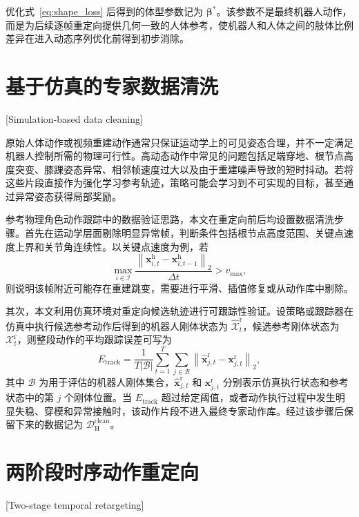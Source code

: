 优化式~\eqref{eq:shape_loss} 后得到的体型参数记为 $\boldsymbol{\beta}^{\ast}$。该参数不是最终机器人动作，而是为后续逐帧重定向提供几何一致的人体参考，使机器人和人体之间的肢体比例差异在进入动态序列优化前得到初步消除。

\section{基于仿真的专家数据清洗}[Simulation-based data cleaning]

原始人体动作或视频重建动作通常只保证运动学上的可见姿态合理，并不一定满足机器人控制所需的物理可行性。高动态动作中常见的问题包括足端穿地、根节点高度突变、膝踝姿态异常、相邻帧速度过大以及由于重建噪声导致的短时抖动。若将这些片段直接作为强化学习参考轨迹，策略可能会学习到不可实现的目标，甚至通过异常姿态获得局部奖励。

参考物理角色动作跟踪中的数据验证思路\cite{tessler2024maskedmimic,he2024learning}，本文在重定向前后均设置数据清洗步骤。首先在运动学层面剔除明显异常帧，判断条件包括根节点高度范围、关键点速度上界和关节角连续性。以关键点速度为例，若
\begin{equation}
\max_{i\in\mathcal{I}}
\frac{
\left\|
\boldsymbol{x}^{\mathrm{h}}_{i,t}
-
\boldsymbol{x}^{\mathrm{h}}_{i,t-1}
\right\|_2
}{\Delta t}
>
v_{\max},
\end{equation}
则说明该帧附近可能存在重建跳变，需要进行平滑、插值修复或从动作库中剔除。

其次，本文利用仿真环境对重定向候选轨迹进行可跟踪性验证\cite{tessler2024maskedmimic,he2024learning}。设策略或跟踪器在仿真中执行候选参考动作后得到的机器人刚体状态为 $\hat{\mathcal{X}}^{\mathrm{r}}_t$，候选参考刚体状态为 $\mathcal{X}^{\mathrm{r}}_t$，则整段动作的平均跟踪误差可写为
\begin{equation}
E_{\mathrm{track}}
=
\frac{1}{T|\mathcal{B}|}
\sum_{t=1}^{T}
\sum_{j\in\mathcal{B}}
\left\|
\hat{\boldsymbol{x}}^{\mathrm{r}}_{j,t}
-
\boldsymbol{x}^{\mathrm{r}}_{j,t}
\right\|_2 ,
\end{equation}
其中 $\mathcal{B}$ 为用于评估的机器人刚体集合，$\hat{\boldsymbol{x}}^{\mathrm{r}}_{j,t}$ 和 $\boldsymbol{x}^{\mathrm{r}}_{j,t}$ 分别表示仿真执行状态和参考状态中的第 $j$ 个刚体位置。当 $E_{\mathrm{track}}$ 超过给定阈值，或者动作执行过程中发生明显失稳、穿模和异常接触时，该动作片段不进入最终专家动作库。经过该步骤后保留下来的数据记为 $\mathcal{D}_{\mathrm{H}}^{\mathrm{clean}}$。

\section{两阶段时序动作重定向}[Two-stage temporal retargeting]

